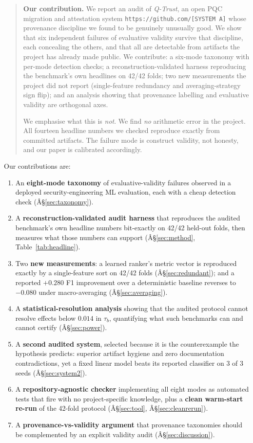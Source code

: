 \documentclass[conference]{IEEEtran}
\newcommand{\code}[1]{\texttt{\small #1}}
\newcommand{\repo}{\code{https://github.com/[SYSTEM A]}}
\begin{document}
\begin{quote}
\textbf{Our contribution.} We report an audit of \emph{Q-Trust}, an open PQC migration and
attestation system \repo{} whose provenance discipline we found to be genuinely
unusually good. We show that six independent failures of evaluative validity survive
that discipline, each concealing the others, and that all are detectable from artifacts
the project has already made public. We contribute: a six-mode taxonomy with per-mode
detection checks; a reconstruction-validated harness reproducing the benchmark's own
headlines on 42/42 folds; two new measurements the project did not report (single-feature
redundancy and averaging-strategy sign flip); and an analysis showing that provenance
labelling and evaluative validity are orthogonal axes.

We emphasise what this is \emph{not}. We find \emph{no} arithmetic error in the project.
All fourteen headline numbers we checked reproduce exactly from committed artifacts. The
failure mode is construct validity, not honesty, and our paper is calibrated
accordingly.
\end{quote}

Our contributions are:

\begin{enumerate}
\itemsep2pt
\item An \textbf{eight-mode taxonomy} of evaluative-validity failures observed in a deployed
security-engineering ML evaluation, each with a cheap detection check (Â§\ref{sec:taxonomy}).
\item A \textbf{reconstruction-validated audit harness} that reproduces the audited
benchmark's own headline numbers bit-exactly on 42/42 held-out folds, then measures what
those numbers can support (Â§\ref{sec:method}, Table~\ref{tab:headline}).
\item Two \textbf{new measurements}: a learned ranker's metric vector is reproduced exactly
by a single-feature sort on 42/42 folds (Â§\ref{sec:redundant}); and a reported
$+0.280$ F1 improvement over a deterministic baseline reverses to $-0.080$ under
macro-averaging (Â§\ref{sec:averaging}).
\item A \textbf{statistical-resolution analysis} showing that the audited protocol cannot
resolve effects below $0.014$ in $\tau_b$, quantifying what such benchmarks can and
cannot certify (Â§\ref{sec:power}).
\item A \textbf{second audited system}, selected because it is the counterexample the
hypothesis predicts: superior artifact hygiene and zero documentation contradictions, yet a
fixed linear model beats its reported classifier on 3 of 3 seeds (Â§\ref{sec:system2}).
\item A \textbf{repository-agnostic checker} implementing all eight modes as automated
tests that fire with no project-specific knowledge, plus a \textbf{clean warm-start re-run}
of the 42-fold protocol (Â§\ref{sec:tool}, Â§\ref{sec:cleanrerun}).
\item A \textbf{provenance-vs-validity argument} that provenance taxonomies should be
complemented by an explicit validity audit (Â§\ref{sec:discussion}).
\end{enumerate}
\end{document}
